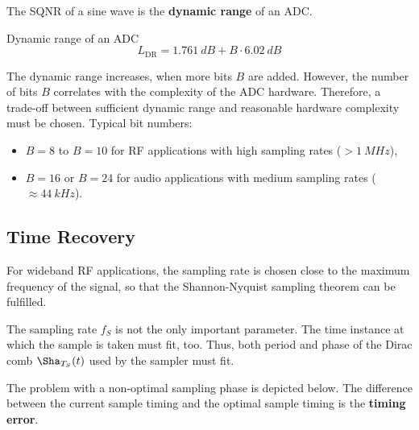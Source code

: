 \begin{refsection}
The \ac{SQNR} of a sine wave is the  \textbf{dynamic range} of an \ac{ADC}.
\begin{definition}{Dynamic range of an \ac{ADC}}
	\begin{equation}
		L_{\mathrm{DR}} = \SI{1.761}{dB} + B \cdot \SI{6.02}{dB}
	\end{equation}
\end{definition}

The dynamic range increases, when more bits $B$ are added. However, the number of bits $B$ correlates with the complexity of the \ac{ADC} hardware. Therefore, a trade-off between sufficient dynamic range and reasonable hardware complexity must be chosen. Typical bit numbers:
\begin{itemize}
	\item $B = 8$ to $B = 10$ for \ac{RF} applications with high sampling rates ($> \SI{1}{MHz}$),
	\item $B = 16$ or $B = 24$ for audio applications with medium sampling rates ($\approx \SI{44}{kHz}$).
\end{itemize}


%

\subsection{Time Recovery}

For wideband \ac{RF} applications, the sampling rate is chosen close to the maximum frequency of the signal, so that the Shannon-Nyquist sampling theorem can be fulfilled.

The sampling rate $f_S$ is not the only important parameter. The time instance at which the sample is taken must fit, too. Thus, both period and phase of the Dirac comb $\Sha_{T_S}(t)$ used by the sampler must fit.

The problem with a non-optimal sampling phase is depicted below. The difference between the current sample timing and the optimal sample timing is the  \textbf{timing error}.


\end{refsection}
